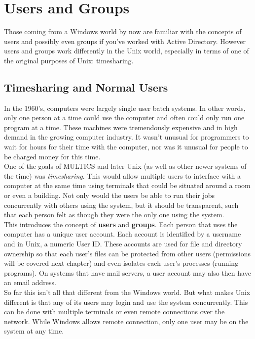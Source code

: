 \chapter{Users and Groups}

Those coming from a Windows world by now are familiar with the concepts of users and possibly even groups if you've worked with Active Directory.  However users and groups work differently in the Unix world, especially in terms of one of the original purposes of Unix: timesharing.

\section{Timesharing and Normal Users}

In the 1960's, computers were largely single user batch systems.  In other words, only one person at a time could use the computer and often could only run one program at a time.  These machines were tremendously expensive and in high demand in the growing computer industry.  It wasn't unusual for programmers to wait for hours for their time with the computer, nor was it unusual for people to be charged money for this time. \\

One of the goals of MULTICS and later Unix (as well as other newer systems of the time) was \textit{timesharing}.  This would allow multiple users to interface with a computer at the same time using terminals that could be situated around a room or even a building.  Not only would the users be able to run their jobs concurrently with others using the system, but it should be transparent, such that each person felt as though they were the only one using the system.\\

This introduces the concept of \textbf{users} and \textbf{groups}.  Each person that uses the computer has a unique user account.  Each account is identified by a username and in Unix, a numeric User ID.  These accounts are used for file and directory ownership so that each user's files can be protected from other users (permissions will be covered next chapter) and even isolates each user's processes (running programs).  On systems that have mail servers, a user account may also then have an email address.\\

So far this isn't all that different from the Windows world.  But what makes Unix different is that any of its users may login and use the system concurrently.  This can be done with multiple terminals or even remote connections over the network.  While Windows allows remote connection, only one user may be on the system at any time.\\

